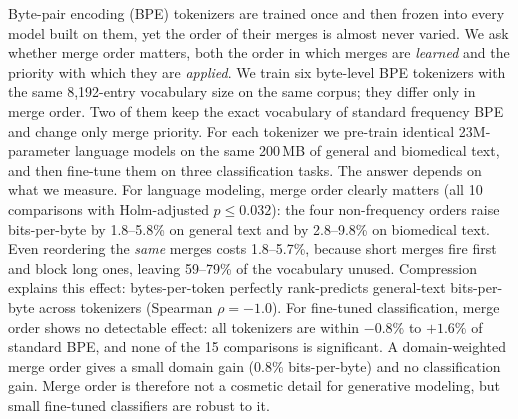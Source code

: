 Byte-pair encoding (BPE) tokenizers are trained once and then frozen into every model built on them, yet the order of their merges is almost never varied.
We ask whether merge order matters, both the order in which merges are \emph{learned} and the priority with which they are \emph{applied}.
We train six byte-level BPE tokenizers with the same 8,192-entry vocabulary size on the same corpus; they differ only in merge order.
Two of them keep the exact vocabulary of standard frequency BPE and change only merge priority.
For each tokenizer we pre-train identical 23M-parameter language models on the same 200\,MB of general and biomedical text, and then fine-tune them on three classification tasks.
The answer depends on what we measure.
For language modeling, merge order clearly matters (all 10 comparisons with Holm-adjusted $p \le 0.032$): the four non-frequency orders raise bits-per-byte by 1.8--5.8\% on general text and by 2.8--9.8\% on biomedical text.
Even reordering the \emph{same} merges costs 1.8--5.7\%, because short merges fire first and block long ones, leaving 59--79\% of the vocabulary unused.
Compression explains this effect: bytes-per-token perfectly rank-predicts general-text bits-per-byte across tokenizers (Spearman $\rho=-1.0$).
For fine-tuned classification, merge order shows no detectable effect: all tokenizers are within $-0.8\%$ to $+1.6\%$ of standard BPE, and none of the 15 comparisons is significant.
A domain-weighted merge order gives a small domain gain (0.8\% bits-per-byte) and no classification gain.
Merge order is therefore not a cosmetic detail for generative modeling, but small fine-tuned classifiers are robust to it.
